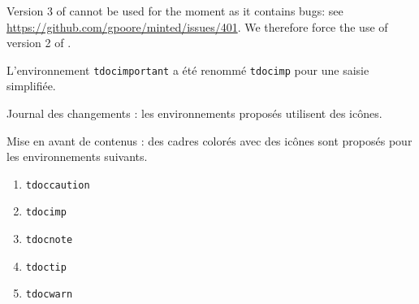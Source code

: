 \begin{tdocprob}
	\item Version 3 of  cannot be used for the moment as it contains bugs: see \url{https://github.com/gpoore/minted/issues/401}. We therefore force the use of version 2 of .
\end{tdocprob}


\begin{tdocbreak}
	\item L'environnement \verb#tdocimportant# a été renommé \verb#tdocimp# pour une saisie simplifiée.
\end{tdocbreak}


\begin{tdocnew}
    \item Journal des changements : les environnements proposés utilisent des icônes.


    \item Mise en avant de contenus : des cadres colorés avec des icônes sont proposés pour les environnements suivants.
    \bgroup
    \setlength{\multicolsep}{3.0pt plus 1.0pt minus 0.75pt}
    \begin{multicols}{3}
        \begin{enumerate}
        	\item \verb#tdoccaution#
        	\item \verb#tdocimp#
        	\item \verb#tdocnote#
        	\item \verb#tdoctip#
        	\item \verb#tdocwarn#
        \end{enumerate}
    \end{multicols}
    \egroup
\end{tdocnew}
